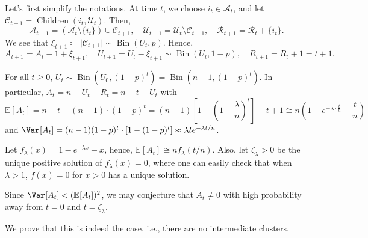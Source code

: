Let's first simplify the notations. At time \(t\), we choose \(i_t \in \mathcal{A} _t\), and let \(\mathcal{C} _{t+1} = \operatorname{Children}(i_t, \mathcal{U} _t) \). Then,
\[
	\mathcal{A} _{t+1} = (\mathcal{A} _t \setminus \{ i_t \} ) \cup \mathcal{C} _{t+1}, \quad
	\mathcal{U} _{t+1} = \mathcal{U} _t \setminus \mathcal{C} _{t+1}, \quad
	\mathcal{R} _{t+1} = \mathcal{R} _{t} + \{ i_t \} .
\]
We see that \(\xi _{t+1} \coloneqq \lvert \mathcal{C} _{t+1} \rvert \sim \operatorname{Bin}(U_t, p) \). Hence,
\[
	A_{t+1} = A_t - 1 + \xi _{t+1}, \quad
	U_{t+1} = U_t - \xi _{t+1} \sim \operatorname{Bin}(U_t, 1 - p), \quad
	R_{t+1} = R_t + 1 = t+1.
\]

\begin{claim}
	For all \(t \geq 0\), \(U_t \sim \operatorname{Bin}(U_0, (1 - p)^t) = \operatorname{Bin}(n-1, (1 - p)^t)  \). In particular, \(A_t = n - U_t - R_t = n - t - U_t\) with
	\[
		\mathbb{E}_{}[A_t]
		= n - t - (n - 1) \cdot (1 - p)^t
		= (n-1) \left[ 1 - \left( 1- \frac{\lambda}{n} \right) ^t \right]  - t + 1
		\cong n \left( 1 - e^{-\lambda \cdot \frac{t}{n}} - \frac{t}{n} \right)
	\]
	and \(\Var_{}[A_t] = (n-1)(1 - p)^t \cdot [1 - (1 - p)^t] \approx \lambda t e^{-\lambda t / n}\).
\end{claim}

Let \(f_\lambda (x) = 1 - e^{-\lambda x} - x\), hence, \(\mathbb{E}_{}[A_t] \cong n f_\lambda (t / n)\). Also, let \(\zeta _\lambda > 0\) be the unique positive solution of \(f_\lambda (x) = 0\), where one can easily check that when \(\lambda > 1\), \(f(x) = 0\) for \(x > 0\) has a unique solution.

\begin{intuition}
	Since \(\Var_{}[A_t] < (\mathbb{E}_{}[A_t]) ^2 \), we may conjecture that \(A_t \neq 0\) with high probability away from \(t = 0\) and \(t = \zeta _\lambda \).
\end{intuition}

We prove that this is indeed the case, i.e., there are no intermediate clusters.

